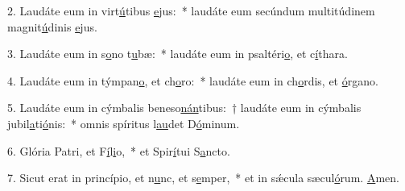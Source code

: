 2. Laudáte eum in virt\uline{ú}tibus \uline{e}jus:~* laudáte eum secúndum multitúdinem magnit\uline{ú}dinis \uline{e}jus.\par 
3. Laudáte eum in s\uline{o}no t\uline{u}bæ:~* laudáte eum in psaltéri\uline{o}, et c\uline{í}thara.\par 
4. Laudáte eum in týmpan\uline{o}, et ch\uline{o}ro:~* laudáte eum in ch\uline{o}rdis, et \uline{ó}rgano.\par 
5. Laudáte eum in cýmbalis beneso\uline{nán}tibus:~† laudáte eum in cýmbalis jubil\uline{a}ti\uline{ó}nis:~* omnis spíritus l\uline{au}det D\uline{ó}minum.\par 
6. Glória Patri, et F\uline{í}l\uline{i}o,~* et Spir\uline{í}tui S\uline{a}ncto.\par 
7. Sicut erat in princípio, et n\uline{u}nc, et s\uline{e}mper,~* et in sǽcula sæcul\uline{ó}rum. \uline{A}men.\par 
